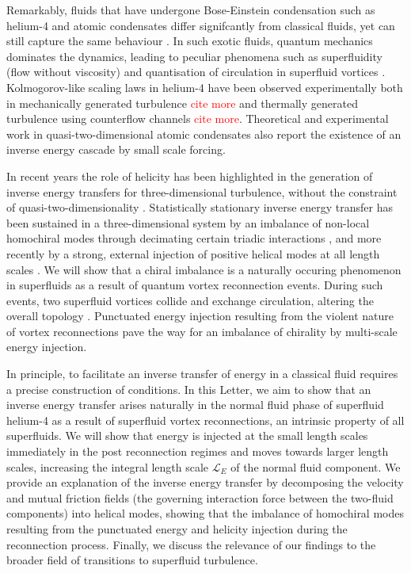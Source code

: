 \documentclass[%
 reprint,
 amsmath,amssymb,
 aps,
 prl,
]{revtex4-2}
\def\red#1{\textcolor{red}{#1}}
\begin{document}
Remarkably, fluids that have undergone Bose-Einstein condensation such as helium-4 and atomic condensates differ signifcantly from classical fluids, yet can still capture the same behaviour \cite{maurer1998,baggaley2012,sherwin-robson2015}. In such exotic fluids, quantum mechanics dominates the dynamics, leading to peculiar phenomena such as superfluidity (flow without viscosity) and quantisation of circulation in superfluid vortices \cite{barenghi2009vortices}. Kolmogorov-like scaling laws in helium-4 have been observed experimentally both in mechanically generated turbulence \cite{salort2010turbulent} \red{cite more} and thermally generated turbulence using counterflow channels \cite{gao2017energy} \red{cite more}. Theoretical \cite{bradley2012energy,reeves2013,simula2014emergence} and experimental \cite{johnstone2019evolution,gauthier2019giant} work in quasi-two-dimensional atomic condensates also report the existence of an inverse energy cascade by small scale forcing.

In recent years the role of helicity has been highlighted in the generation of inverse energy transfers for three-dimensional turbulence, without the constraint of quasi-two-dimensionality \cite{chen2003,biferaleInverseEnergyCascade2012a}. Statistically stationary inverse energy transfer has been sustained in a three-dimensional system by an imbalance of non-local homochiral modes through decimating certain triadic interactions \cite{biferaleInverseEnergyCascade2012a}, and more recently by a strong, external injection of positive helical modes at all length scales \cite{plunianInverseCascadeEnergy2020a}. We will show that a chiral imbalance is a naturally occuring phenomenon in superfluids as a result of quantum vortex reconnection events.  During such events, two superfluid vortices collide and exchange circulation, altering the overall topology \cite{villois2020irreversible,zuccher2012quantum}. Punctuated energy injection resulting from the violent nature of vortex reconnections \cite{stasiak2024quantum} pave the way for an imbalance of chirality by multi-scale energy injection. 

In principle, to facilitate an inverse transfer of energy in a classical fluid requires a precise construction of conditions. In this Letter, we aim to show that an inverse energy transfer arises naturally in the normal fluid phase of superfluid helium-4 as a result of superfluid vortex reconnections, an intrinsic property of all superfluids. We will show that energy is injected at the small length scales immediately in the post reconnection regimes and moves towards larger length scales, increasing the integral length scale $\mathcal{L}_E$ of the normal fluid component. We provide an explanation of the inverse energy transfer by decomposing the velocity and mutual friction fields (the governing interaction force between the two-fluid components) into helical modes, showing that the imbalance of homochiral modes resulting from the punctuated energy and helicity injection during the reconnection process. Finally, we discuss the relevance of our findings to the broader field of transitions to superfluid turbulence. 
\end{document}
